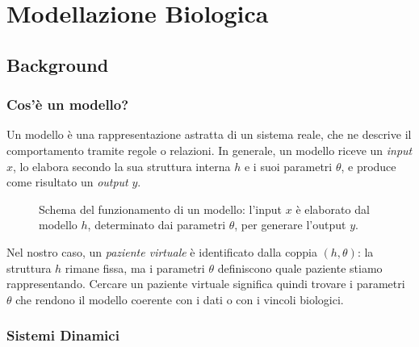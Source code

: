 \chapter{Modellazione Biologica}

\section{Background}

\subsection{Cos'è un modello?}


Un modello è una rappresentazione astratta di un sistema reale, che ne descrive 
il comportamento tramite regole o relazioni. In generale, un modello riceve un 
\emph{input} $x$, lo elabora secondo la sua struttura interna $h$ e i suoi 
parametri $\theta$, e produce come risultato un \emph{output} $y$.

\begin{figure}[h]
\centering
{}
\caption{Schema del funzionamento di un modello: l'input $x$ è elaborato dal 
modello $h$, determinato dai parametri $\theta$, per generare l'output $y$.}
\label{fig:modello}
\end{figure}

Nel nostro caso, un \emph{paziente virtuale} è identificato dalla coppia 
$(h, \theta)$: la struttura $h$ rimane fissa, ma i parametri $\theta$ 
definiscono quale paziente stiamo rappresentando. Cercare un paziente virtuale 
significa quindi trovare i parametri $\theta$ che rendono il modello coerente 
con i dati o con i vincoli biologici.

\subsection{Sistemi Dinamici}

